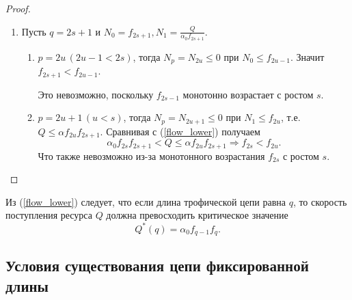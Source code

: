 \begin{proof}
\begin{enumerate}
            \item Пусть \( q = 2s+1 \) и \( N_0 = f_{2s+1}, N_1 = \frac{Q}{\alpha_0 f_{2s+1}}\).
            \begin{enumerate}
                \item \(p = 2u \, (2u-1 < 2s)\), тогда \( N_p = N_{2u} \leq 0 \) при \(N_0 \leq f_{2u-1}\). Значит \(f_{2s+1} < f_{2u-1} \). 
                
                Это невозможно, поскольку \(f_{2s-1}\) монотонно возрастает с ростом \(s\).

                \item \(p = 2u+1 \, (u < s)\), тогда \( N_p = N_{2u+1} \leq 0 \) при \(N_1 \leq f_{2u}\), т.е. \( Q \leq \alpha f_{2u} f_{2s+1} \). Сравнивая с (\ref{flow_lower}) получаем
                \begin{equation*}
                    \alpha_0 f_{2s} f_{2s+1} < Q \leq \alpha f_{2u} f_{2s+1} \Rightarrow f_{2s} < f_{2u}.
                \end{equation*}
                Что также невозможно из-за монотонного возрастания \(f_{2s}\) с ростом \(s\). 
            \end{enumerate}
        \end{enumerate}
    \end{proof}
    
    \begin{corollary}
        Из (\ref{flow_lower}) следует, что если длина трофической цепи равна \(q\), то скорость поступления ресурса \( Q \) должна превосходить критическое значение 
        \begin{equation*}
            Q^* (q) = \alpha_0 f_{q-1} f_{q}.
        \end{equation*}
    \end{corollary}

\subsection{Условия существования цепи фиксированной длины}

